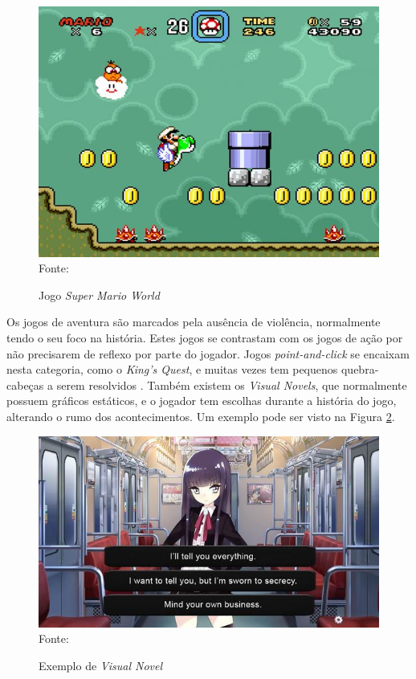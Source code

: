 \documentclass[
	12pt,					%
	openright,				%
	oneside,				%
	a4paper,				%
	bibjustif,				%
	chapter=TITLE,			%
	english,				%
	brazil,					%
	]{abntex2}
\newcommand{\source}[1]{\small Fonte: {#1}}
\begin{document}
		\begin{figure}[ht!]
			\caption{Jogo \textit{Super Mario World}}
			\centering
			\includegraphics[scale=0.35]{img/marioworld.jpg}\\
			\vspace{0.5mm}
			\source{}
			\label{fig:marioWorld}
		\end{figure}
		
		Os jogos de aventura são marcados pela ausência de violência,
		normalmente tendo o seu foco na história.
		Estes jogos se contrastam com os jogos de ação por não precisarem de reflexo por parte do jogador.
		Jogos \textit{point-and-click} se encaixam nesta categoria,
		como o \textit{King's Quest},
		e muitas vezes tem pequenos quebra-cabeças a serem resolvidos \cite{gameGenres}.
		Também existem os \textit{Visual Novels},
		que normalmente possuem gráficos estáticos,
		e o jogador tem escolhas durante a história do jogo,
		alterando o rumo dos acontecimentos.
		Um exemplo pode ser visto na Figura \ref{fig:visualNovel}.
		
		\begin{figure}[ht!]
			\caption{Exemplo de \textit{Visual Novel}}
			\centering
			\includegraphics[scale=0.6]{img/visual_novel.jpg}\\
			\vspace{0.5mm}
			\source{}
			\label{fig:visualNovel}
		\end{figure}
		
\end{document}
